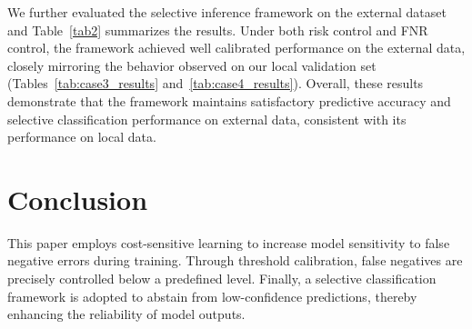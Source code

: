 \documentclass[journal]{IEEEtran}
\theoremstyle{remark}
\begin{document}
\begin{table}[htbp]
    \centering
    \caption{The selective classification performance of external validation.}
    \label{tab2}
    \renewcommand\arraystretch{1.2} 
\end{table}

We further evaluated the selective inference framework on the external dataset and Table~\ref{tab2} summarizes the results. Under both risk control and FNR control, the framework achieved well calibrated performance on the external data, closely mirroring the behavior observed on our local validation set (Tables~\ref{tab:case3_results} and~\ref{tab:case4_results}). Overall, these results demonstrate that the framework maintains satisfactory predictive accuracy and selective classification performance on external data, consistent with its performance on local data.

\section{Conclusion}

This paper employs cost-sensitive learning to increase model sensitivity to false negative errors during training. Through threshold calibration, false negatives are precisely controlled below a predefined level. Finally, a selective classification framework is adopted to abstain from low-confidence predictions, thereby enhancing the reliability of model outputs.
\end{document}
